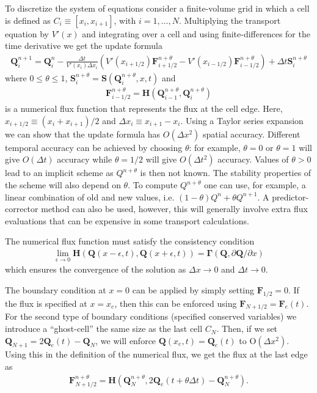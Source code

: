 \documentclass[11pt, reqno]{amsart}
\newcommand{\pfracb}[2]{\partial #1/\partial #2}
\newcommand{\mvec}[1]{\mathbf{#1}}
\theoremstyle{definition}
\begin{document}
To discretize the system of equations consider a finite-volume grid in
which a cell is defined as $C_i \equiv [x_i, x_{i+1}]$, with
$i=1,\ldots,N$. Multiplying the transport equation by $V'(x)$ and
integrating over a cell and using finite-differences for the time
derivative we get the update formula
\begin{align}
  \mvec{Q}_i^{n+1} = \mvec{Q}^n_i - \frac{\Delta t}{V'(x_i) \Delta x_i}
  \left (
    V'(x_{i+1/2}) \mvec{F}_{i+1/2}^{n+\theta} - 
    V'(x_{i-1/2}) \mvec{F}_{i-1/2}^{n+\theta}
  \right)
  +
  \Delta t \mvec{S}_i^{n+\theta} \label{eqn:update-form}
\end{align}
where $0\le\theta\le 1$,
$\mvec{S}_i^{n+\theta}=\mvec{S}(\mvec{Q}_i^{n+\theta},x,t)$ and
\begin{align}
  \mvec{F}_{i-1/2}^{n+\theta} = 
  \mvec{H}(
  \mvec{Q}_{i-1}^{n+\theta},
  \mvec{Q}_i^{n+\theta}
  ) \label{eqn:flux-func}
\end{align}
is a numerical flux function that represents the flux at the cell
edge. Here, $x_{i+1/2} \equiv (x_i+x_{i+1})/2$ and $\Delta x_i \equiv
x_{i+1}-x_i$. Using a Taylor series expansion we can show that the
update formula has $O(\Delta x^2)$ spatial accuracy. Different
temporal accuracy can be achieved by choosing $\theta$: for example,
$\theta=0$ or $\theta=1$ will give $O(\Delta t)$ accuracy while
$\theta=1/2$ will give $O(\Delta t^2)$ accuracy. Values of $\theta>0$
lead to an implicit scheme as $Q^{n+\theta}$ is then not known. The
stability properties of the scheme will also depend on $\theta$. To
compute $Q^{n+\theta}$ one can use, for example, a linear combination
of old and new values, i.e. $(1-\theta)Q^n + \theta Q^{n+1}$. A
predictor-corrector method can also be used, however, this will
generally involve extra flux evaluations that can be expensive in some
transport calculations.

The numerical flux function must satisfy the consistency
condition
\begin{align}
  \lim_{\epsilon\rightarrow 0} \mvec{H}
  \left(
    \mvec{Q}(x-\epsilon,t),
    \mvec{Q}(x+\epsilon,t)
  \right)
  =
  \mvec{\Gamma}(\mvec{Q},\pfracb{\mvec{Q}}{x})
\end{align}
which ensures the convergence of the solution as $\Delta x \rightarrow
0$ and $\Delta t \rightarrow 0$.

The boundary condition at $x=0$ can be applied by simply setting
$\mvec{F}_{1/2}=0$. If the flux is specified at $x=x_e$, then this can
be enforced using $\mvec{F}_{N+1/2}=\mvec{F}_e(t)$. For the second
type of boundary conditions (specified conserved variables) we
introduce a ``ghost-cell'' the same size as the last cell $C_N$. Then,
if we set $\mvec{Q}_{N+1} = 2\mvec{Q}_e(t) - \mvec{Q}_N$, we will
enforce $\mvec{Q}(x_e,t) = \mvec{Q}_e(t)$ to $\textrm{O}(\Delta
x^2)$. Using this in the definition of the numerical flux, we get the
flux at the last edge as
\begin{align}
  \mvec{F}_{N+1/2}^{n+\theta} = \mvec{H}(\mvec{Q}_N^{n+\theta},
  2\mvec{Q}_e(t+\theta\Delta t) - \mvec{Q}_N^{n+\theta}).
\end{align}
\end{document}
